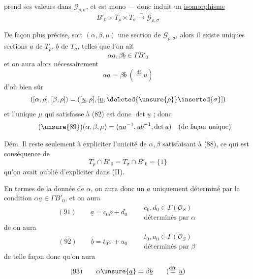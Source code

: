 
 prend ses valeurs dans $\mathcal G_{\rho,\sigma}$, et est mono --- donc induit un \uline{isomorphisme}
\[
\tag{87}B'_0\times T_\rho\times T_\sigma\xrightarrow{\sim}\mathcal G_{\rho,\sigma}
\]

De façon plus précise, soit  $(\alpha,\beta,\mu)$ une section de $\mathcal G_{\rho,\sigma}$, alors il existe  uniques sections  $\underline a$ de $T_\rho$, $\underline b$ de $T_\sigma$, telles que l'on ait
\[
\tag{88}\alpha\underline a,\beta\underline b\in\Gamma B'_0
\]
et on aura alors nécessairement
\[
\alpha\underline a=\beta\underline b\ (\overset{\mathrm{df}}{=}\underline u)
\]
d'où bien sûr
\[
([\alpha,\rho],[\beta,\rho])=([\underline u,\rho],[\underline u,\deleted{\unsure{\rho}}\inserted{\sigma}])
\]
et l'unique $\mu$ qui satisfasse à (82) est donc $\det\underline u$  ; donc
\[
\tag{\unsure{89}}(\alpha,\beta,\mu)=(\underline u\underline a^{-1},\underline u\underline b^{-1},\det\underline u)\quad\text{(de façon unique)}
\]

Dém. Il reste seulement à expliciter l'unicité de $\alpha,\beta$ satisfaisant à (88), ce qui est conséquence de
\[
\tag{90}T_\rho\cap B'_0=T_\sigma\cap B'_0=\{1\}
\]
qu'on avait oublié d'expliciter dans (II).


En termes de la  donnée de $\alpha$, on aura donc un $\underline a$ uniquement déterminé par la condition $\alpha\underline a\in\Gamma B'_0$, et on aura
\[
(91)\qquad \underline a=c_0\rho+d_0
\qquad
\begin{gathered}
c_0,d_0\in\Gamma(\mathcal O_S)\\
\text{déterminés par }\alpha
\end{gathered}
\]
de  on aura
\[
(92)\qquad \underline b=t_0\sigma+u_0
\qquad
\begin{gathered}
t_0,u_0\in\Gamma(\mathcal O_S)\\
\text{déterminés par }\beta
\end{gathered}
\]
de telle façon donc qu'on aura
\[
(93)\qquad \alpha\unsure{\underline a}=\beta\underline b
\qquad (\overset{\mathrm{dfn}}{=}\underline u)
\]

